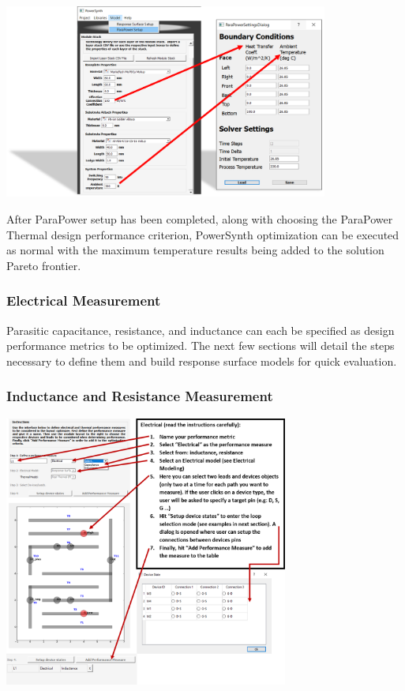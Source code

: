 \documentclass[11pt]{article}
\begin{document}
\begin{center}
\includegraphics[width=0.8\textwidth]{./figs/ParaPower/ParaPowerSettings.png}
\end{center}

After ParaPower setup has been completed, along with choosing the ParaPower Thermal design performance criterion, PowerSynth optimization can be executed as normal  with the maximum temperature results being added to the solution Pareto frontier.


\pagebreak

\subsubsection{Electrical Measurement}
\label{sec-2-5-2}

Parasitic capacitance, resistance, and inductance can each be specified as design performance metrics to be optimized. The next few sections will detail the steps necessary to define them and build response surface models for quick evaluation.

\subsubsection{Inductance and Resistance Measurement}
\label{sec-2-5-3}

\begin{center}
\includegraphics[width=0.7\textwidth]{./figs/18_electrical.png}
\end{center}
\end{document}
